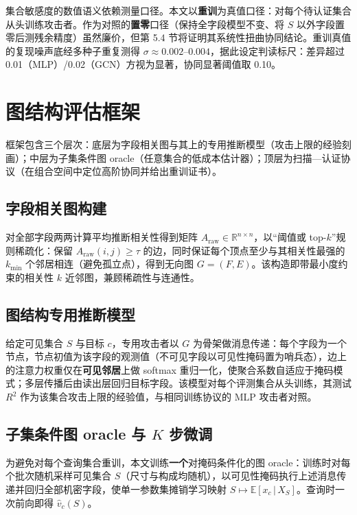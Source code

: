 \documentclass[10.5pt,compsoc,UTF8]{CjC}
\theoremstyle{mystyle}
\begin{document}
集合敏感度的数值语义依赖测量口径。本文以\textbf{重训}为真值口径：对每个待认证集合从头训练攻击者。作为对照的\textbf{置零}口径（保持全字段模型不变、将 $S$ 以外字段置零后测残余精度）虽然廉价，但第 5.4 节将证明其系统性扭曲协同结论。重训真值的复现噪声底经多种子重复测得 $\sigma\approx0.002$--$0.004$，据此设定判读标尺：差异超过 0.01（MLP）/0.02（GCN）方视为显著，协同显著阈值取 0.10。

\section{\heiti 图结构评估框架}

框架包含三个层次：底层为字段相关图与其上的专用推断模型（攻击上限的经验刻画）；中层为子集条件图 oracle（任意集合的低成本估计器）；顶层为扫描—认证协议（在组合空间中定位高阶协同并给出重训证书）。

\subsection{字段相关图构建}

对全部字段两两计算平均推断相关性得到矩阵 $A_{\mathrm{raw}}\in\mathbb{R}^{n\times n}$，以“阈值或 top-$k$”规则稀疏化：保留 $A_{\mathrm{raw}}(i,j)\ge\tau$ 的边，同时保证每个顶点至少与其相关性最强的 $k_{\min}$ 个邻居相连（避免孤立点），得到无向图 $G=(F,E)$。该构造即带最小度约束的相关性 $k$ 近邻图，兼顾稀疏性与连通性。

\subsection{图结构专用推断模型}

给定可见集合 $S$ 与目标 $c$，专用攻击者以 $G$ 为骨架做消息传递：每个字段为一个节点，节点初值为该字段的观测值（不可见字段以可见性掩码置为哨兵态），边上的注意力权重仅在\textbf{可见邻居}上做 softmax 重归一化，使聚合系数自适应于掩码模式；多层传播后由读出层回归目标字段。该模型对每个评测集合从头训练，其测试 $R^2$ 作为该集合攻击上限的经验值，与相同训练协议的 MLP 攻击者对照。

\subsection{子集条件图 oracle 与 $K$ 步微调}

为避免对每个查询集合重训，本文训练\textbf{一个}对掩码条件化的图 oracle：训练时对每个批次随机采样可见集合 $S$（尺寸与构成均随机），以可见性掩码执行上述消息传递并回归全部机密字段，使单一参数集摊销学习映射 $S\mapsto \mathbb{E}[x_c\,|\,X_S]$。查询时一次前向即得 $\hat v_c(S)$。
\end{document}
